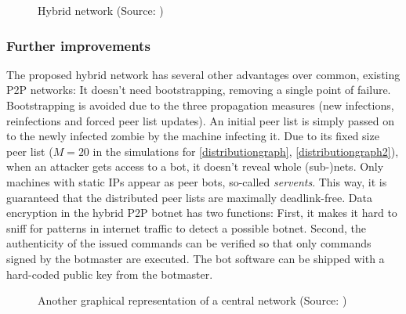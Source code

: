 \documentclass{llncs}
\begin{document}
\begin{figure}[htbp]
  \centering
  \caption{Hybrid network (Source: \cite{td1sc})}
  \label{hybrid-network}
\end{figure}

\subsubsection{Further improvements}
\label{hybridimprovs}
The proposed hybrid network has several other advantages over common,
existing P2P networks: It doesn't need bootstrapping, removing a
single point of failure. Bootstrapping is avoided due to the three
propagation measures (new infections, reinfections and forced peer
list updates). An initial peer list is simply passed on to the newly
infected zombie by the machine infecting it. Due to its fixed size
peer list ($M=20$ in the simulations for \ref{distributiongraph},
\ref{distributiongraph2}), when an attacker gets access to a bot, it
doesn't reveal whole (sub-)nets.  Only machines with static IPs appear
as peer bots, so-called {\it servents}. This way, it is guaranteed that
the distributed peer lists are maximally deadlink-free. Data
encryption in the hybrid P2P botnet has two functions: First, it makes
it hard to sniff for patterns in internet traffic to detect a possible
botnet. Second, the authenticity of the issued commands can be
verified so that only commands signed by the botmaster are
executed. The bot software can be shipped with a hard-coded public key
from the botmaster.

\begin{figure}[htbp]
  \centering
  \caption{Another graphical representation of a central network (Source: \cite{td1sc})}
  \label{central-network2}
\end{figure}
\end{document}
